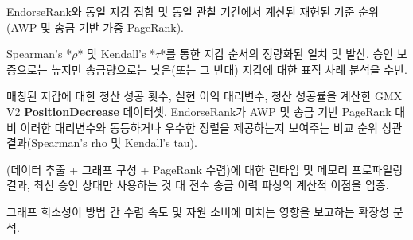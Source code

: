 EndorseRank와 동일 지갑 집합 및 동일 관찰 기간에서 계산된 재현된 기준 순위(AWP 및 송금 기반 가중 PageRank).


Spearman's *\(\rho\)* 및 Kendall's *\(\tau\)*를 통한 지갑 순서의 정량화된 일치 및 발산, 승인 보증으로는 높지만 송금량으로는 낮은(또는 그 반대) 지갑에 대한 표적 사례 분석을 수반.



매칭된 지갑에 대한 청산 성공 횟수, 실현 이익 대리변수, 청산 성공률을 계산한 GMX V2 \textbf{PositionDecrease} 데이터셋, EndorseRank가 AWP 및 송금 기반 PageRank 대비 이러한 대리변수와 동등하거나 우수한 정렬을 제공하는지 보여주는 비교 순위 상관 결과(Spearman's rho 및 Kendall's tau).



(데이터 추출 + 그래프 구성 + PageRank 수렴)에 대한 런타임 및 메모리 프로파일링 결과, 최신 승인 상태만 사용하는 것 대 전수 송금 이력 파싱의 계산적 이점을 입증.


그래프 희소성이 방법 간 수렴 속도 및 자원 소비에 미치는 영향을 보고하는 확장성 분석.
